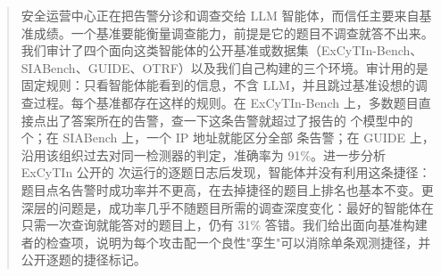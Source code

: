 \begin{abstract}
安全运营中心正在把告警分诊和调查交给 LLM 智能体，而信任主要来自基准成绩。一个基准要能衡量调查能力，前提是它的题目不调查就答不出来。我们审计了四个面向这类智能体的公开基准或数据集（ExCyTIn-Bench、SIABench、GUIDE、OTRF）以及我们自己构建的三个环境。审计用的是固定规则：只看智能体能看到的信息，不含 LLM，并且跳过基准设想的调查过程。每个基准都存在这样的规则。在 ExCyTIn-Bench 上，多数题目直接点出了答案所在的告警，查一下这条告警就超过了报告的 \oModels{} 个模型中的 \oBelowGraph{} 个；在 SIABench 上，一个 IP 地址就能区分全部 \siaN{} 条告警；在 GUIDE 上，沿用该组织过去对同一检测器的判定，准确率为 91\%。进一步分析 ExCyTIn 公开的 \lgModels{} 次运行的逐题日志后发现，智能体并没有利用这条捷径：题目点名告警时成功率并不更高，在去掉捷径的题目上排名也基本不变。更深层的问题是，成功率几乎不随题目所需的调查深度变化：最好的智能体在只需一次查询就能答对的题目上，仍有 31\% 答错。我们给出面向基准构建者的检查项，说明为每个攻击配一个良性"孪生"可以消除单条观测捷径，并公开逐题的捷径标记。
\end{abstract}
